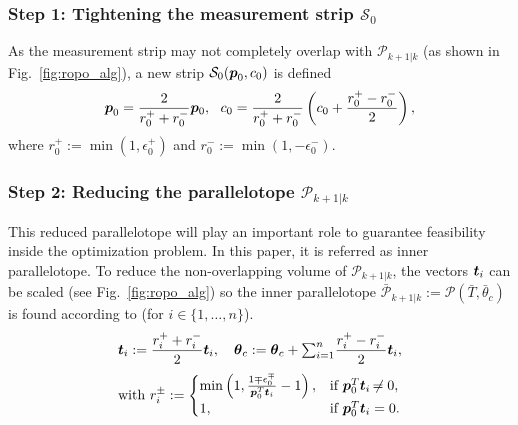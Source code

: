 \documentclass{ifacconf}
\def\ve#1{\mathchoice{\mbox{\boldmath$\displaystyle#1$}}
{\mbox{\boldmath$\textstyle#1$}}
{\mbox{\boldmath$\scriptstyle#1$}}
{\mbox{\boldmath$\scriptscriptstyle#1$}}}
\begin{document}
\subsubsection{Step 1: Tightening the measurement strip $\mathcal{S}_0$}
As the measurement strip may not completely overlap with $\mathcal{P}_{k+1|k}$ (as shown in Fig.~\ref{fig:ropo_alg}), a new strip $\bar{\mathcal{S}}_0(\bar{\ve p}_0,\bar{c}_0)$ is defined
 \begin{align}
 \bar{\ve p}_0 = \frac{2}{r_0^+ + r_0^-} \ve p_0, \ \
 \bar{c}_0 = \frac{2}{r_0^+ + r_0^-} \left( c_0 + \frac{r_0^+ - r_0^-}{2} \right),
 \end{align}
where $r_0^+ := \min(1,{\epsilon}_0^+)$ and $r_0^- := \min(1,-{\epsilon}_0^-)$.

\subsubsection{Step 2: Reducing the parallelotope $\mathcal{P}_{k+1|k}$}
This reduced parallelotope will play an important role to guarantee feasibility inside the optimization problem. In this paper, it is referred as inner parallelotope. To reduce the non-overlapping volume of $\mathcal{P}_{k+1|k}$, the vectors $\ve t_i$ can be scaled (see Fig.~\ref{fig:ropo_alg}) so the inner parallelotope $\bar{\mathcal{P}}_{k+1|k} := \mathcal P (\bar{T},\bar{\theta}_c)$ is found according to (for $i\in\{1,\ldots,n\}$). 
\begin{align} 
 \bar{\ve t}_i := \frac{r_i^+ + r_i^-}{2} \ve t_i, \quad
 \bar{\ve\theta}_c := \ve\theta_c + {\textstyle\sum_{i=1}^{n}} \frac{r_i^+ - r_i^-}{2} \ve t_i,
\end{align}
\begin{align}
\text{with } r_i^\pm := \begin{cases}
         \min \left(1,\frac{1\mp{\epsilon}_0^\mp}{\ve p_0^T \ve t_i}-1 \right),
          & \textrm{if} \ \ve p_0^T \ve t_i \neq 0,\\
         1, & \textrm{if} \ \ve p_0^T \ve t_i = 0.
         \end{cases}  
\end{align}
\end{document}
